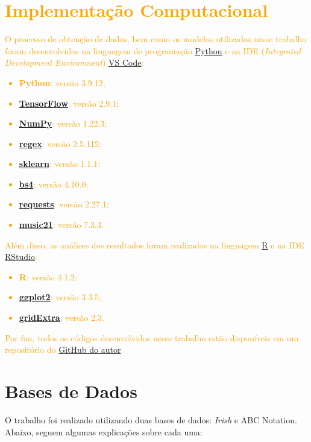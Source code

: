 \documentclass{automatextcc}
\newcommand{\nico}[1]{\textcolor{orange}{#1}}
\begin{document}
\section{\nico{Implementação Computacional}}
\nico{
O processo de obtenção de dados, bem como os modelos utilizados nesse trabalho foram desenvolvidos na linguagem de programação \href{https://python.org/}{Python} e na IDE (\textit{Integrated Development Environment}) \href{https://code.visualstudio.com}{VS Code}:
\begin{itemize}
    \item \textbf{Python}: versão 3.9.12;
    \item \href{https://www.tensorflow.org/?hl=pt-br}{\textbf{TensorFlow}}: versão 2.9.1;
    \item \href{https://numpy.org}{\textbf{NumPy}}: versão 1.22.3;
    \item \href{https://pypi.org/project/regex/}{\textbf{regex}}: versão 2.5.112;
    \item \href{https://scikit-learn.org/stable/}{\textbf{sklearn}}: versão 1.1.1;
    \item \href{https://pypi.org/project/beautifulsoup4/}{\textbf{bs4}}: versão 4.10.0;
    \item \href{https://pypi.org/project/requests/}{\textbf{requests}}: versão 2.27.1;
    \item \href{https://web.mit.edu/music21/}{\textbf{music21}}: versão 7.3.3.
\end{itemize}
Além disso, as análises dos resultados foram realizados na linguagem \href{https://cran.r-project.org}{R} e na IDE \href{https://www.rstudio.com}{RStudio}:
\begin{itemize}
    \item \textbf{R}: versão 4.1.2;
    \item \href{https://ggplot2.tidyverse.org}{\textbf{ggplot2}}: versão 3.3.5;
    \item \href{https://cran.r-project.org/web/packages/gridExtra/index.html}{\textbf{gridExtra}}: versão 2.3.
\end{itemize}
Por fim, todos os códigos desenvolvidos nesse trabalho estão disponíveis em um repositório do \href{https://github.com/nmhahn/TCC_NMH}{GitHub do autor}.
}


\section{Bases de Dados}


O trabalho foi realizado utilizando duas bases de dados: \textit{Irish} e {ABC Notation}. Abaixo, seguem algumas explicações sobre cada uma:
\end{document}
